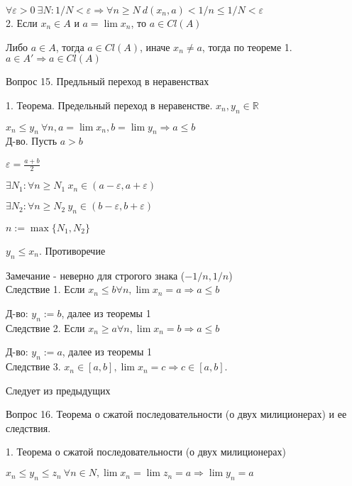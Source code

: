 \documentclass[12pt]{article}
\begin{document}
$\forall \varepsilon>0\ \exists N: 1/N<\varepsilon \Rightarrow \forall n\geq N\ d(x_n, a) < 1/n \leq 1/N < \varepsilon$\\

2. Если $x_n \in A$ и $a=\lim x_n$, то $a \in Cl(A)$

Либо $a\in A$, тогда $a \in Cl(A)$, иначе $x_n \neq a$, тогда по теореме 1. $a \in A' \Rightarrow a \in Cl(A)$
\newpage

\begin{center}
Вопрос 15. Предльный переход в неравенствах
\end{center}

1. Теорема. Предельный переход в неравенстве. $x_n, y_n \in \mathbb{R}$

$x_n \leq y_n\ \forall n, a=\lim x_n, b=\lim y_n \Rightarrow a\leq b$\\

Д-во. Пусть $a>b$

$\varepsilon = \frac{a+b}{2}$

$\exists N_1: \forall n\geq N_1\ x_n\in (a-\varepsilon, a+\varepsilon)$

$\exists N_2: \forall n\geq N_2\ y_n \in (b-\varepsilon, b+\varepsilon)$

$n:=\max\{N_1, N_2\}$

$y_n \leq x_n$. Противоречие

Замечание - неверно для строгого знака ($-1/n, 1/n$)\\

Следствие 1. Если $x_n \leq b \forall n, \lim x_n = a \Rightarrow a\leq b$

Д-во: $y_n:=b$, далее из теоремы 1\\

Следствие 2. Если $x_n \geq a \forall n, \lim x_n = b \Rightarrow a \leq b$

Д-во: $y_n:=a$, далее из теоремы 1\\

Следствие 3. $x_n \in [a, b], \lim x_n = c \Rightarrow c \in [a, b]$. 

Следует из предыдущих\\
\newpage

\begin{center}
Вопрос 16. Теорема о сжатой последовательности (о двух милиционерах) и ее следствия.
\end{center}

1. Теорема о сжатой последовательности (о двух милиционерах)

$x_n \leq y_n \leq z_n\ \forall n\in N, \lim x_n = \lim z_n = a \Rightarrow \lim y_n = a$\\
\end{document}

